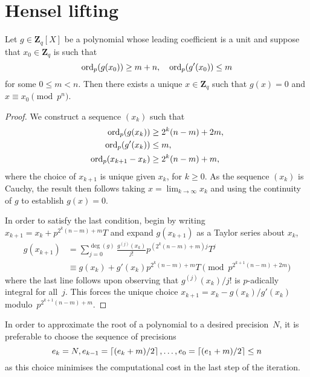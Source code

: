 \section{Hensel lifting}

\begin{thm} \label{thm:Hensel1}
Let $g \in \mathbf{Z}_q[X]$ be a polynomial whose leading coefficient 
is a unit and suppose that $x_0 \in \mathbf{Z}_q$ is such that 
\begin{equation*}
\operatorname{ord}_p(g(x_0)) \geq m + n, \quad \operatorname{ord}_p(g'(x_0)) \leq m
\end{equation*}
for some $0 \leq m < n$.  Then there exists a unique $x \in \mathbf{Z}_q$ 
such that $g(x) = 0$ and $x \equiv x_0 \pmod{p^n}$.
\end{thm}

\begin{proof}
We construct a sequence $(x_k)$ such that 
\begin{align*}
\operatorname{ord}_p(g(x_k)) & \geq 2^k (n - m) + 2m, \\
\operatorname{ord}_p(g'(x_k)) & \leq m, \\
\operatorname{ord}_p(x_{k+1} - x_k) & \geq 2^k (n-m) + m, 
\end{align*}
where the choice of $x_{k+1}$ is unique given $x_k$, for $k \geq 0$.  
As the sequence $(x_k)$ is Cauchy, the result then follows taking 
$x = \lim_{k \to \infty} x_k$ and using the continuity of $g$ to 
establish $g(x) = 0$.

In order to satisfy the last condition, begin by writing 
$x_{k+1} = x_k + p^{2^k(n-m) + m} T$ and expand $g(x_{k+1})$ 
as a Taylor series about $x_k$, 
\begin{align*}
g(x_{k+1}) & = \sum_{j=0}^{\deg(g)} \frac{g^{(j)}(x_k)}{j!} p^{(2^k(n-m) + m) j} T^j \\
           & \equiv g(x_k) + g'(x_k) p^{2^k(n-m) + m} T \pmod{p^{2^{k+1}(n-m)+2m}}
\end{align*}
where the last line follows upon observing that $g^{(j)}(x_k) / j!$ 
is $p$-adically integral for all~$j$.  This forces the unique choice 
$x_{k+1} = x_k - g(x_k) / g'(x_k)$ modulo~${p^{2^{k+1}(n-m) + m}}$.
\end{proof}

\begin{rem}
In order to approximate the root of a polynomial to a desired 
precision~$N$, it is preferable to choose the sequence of 
precisions 
\begin{equation*}
e_{k} = N, e_{k-1} = \left\lceil(e_k + m) / 2\right\rceil, \dotsc, 
e_0 = \left\lceil(e_1 + m) / 2\right\rceil \leq n
\end{equation*}
as this choice minimises the computational cost in the last 
step of the iteration.
\end{rem}

